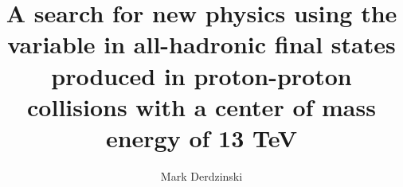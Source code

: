 \title{A search for new physics using the \mttwo variable in all-hadronic final states produced in proton-proton collisions with a center of mass energy of 13 TeV}

\author{Mark Derdzinski}






